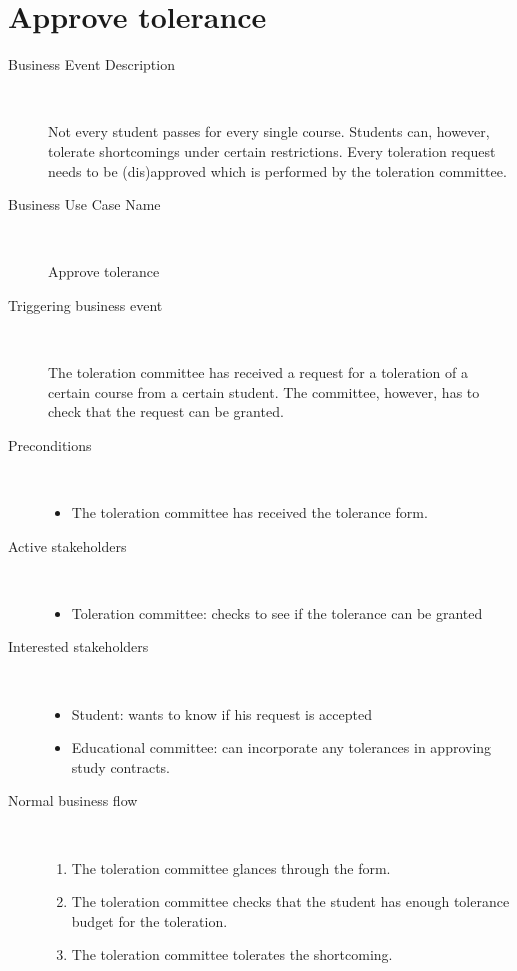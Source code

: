 \section{Approve tolerance}

\begin{description}
	\item[Business Event Description] \ 
		\par Not every student passes for every single course. Students can, however,
		tolerate shortcomings under certain restrictions. Every toleration request
		needs to be (dis)approved which is performed by the toleration committee.
	\item[Business Use Case Name] \ 
		\par Approve tolerance
	\item[Triggering business event] \ 
		\par The toleration committee has received a request for a toleration of a
		certain course from a certain student. The committee, however, has to check that the
		request can be granted. 
	\item[Preconditions] \
	\begin{itemize}
		\item The toleration committee has received the tolerance form.
	\end{itemize}
	\item[Active stakeholders] \ 
	\begin{itemize}
		\item Toleration committee: checks to see if the tolerance can be granted
	\end{itemize}
	\item[Interested stakeholders] \ 
		\begin{itemize}
		\item Student: wants to know if his request is accepted
		\item Educational committee: can incorporate any tolerances in approving study
		contracts.
		\end{itemize}
	\item[Normal business flow] \ 
	\begin{enumerate}
	  	\item The toleration committee glances through the form. 
	  	\item The toleration committee checks that the student has enough tolerance
	  	budget for the toleration.
	  	\item The toleration committee tolerates the shortcoming.

\end{enumerate}
\end{description}

